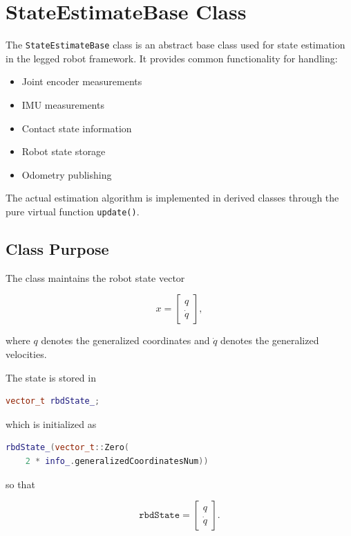 \section{StateEstimateBase Class}

The \texttt{StateEstimateBase} class is an abstract base class used for state estimation in the legged robot framework. It provides common functionality for handling:

\begin{itemize}
    \item Joint encoder measurements
    \item IMU measurements
    \item Contact state information
    \item Robot state storage
    \item Odometry publishing
\end{itemize}

The actual estimation algorithm is implemented in derived classes through the pure virtual function \texttt{update()}.

\subsection{Class Purpose}

The class maintains the robot state vector

\begin{equation}
x =
\begin{bmatrix}
q \\
\dot{q}
\end{bmatrix},
\end{equation}

where \(q\) denotes the generalized coordinates and \(\dot{q}\) denotes the generalized velocities.

The state is stored in

\begin{lstlisting}[language=C++]
vector_t rbdState_;
\end{lstlisting}

which is initialized as

\begin{lstlisting}[language=C++]
rbdState_(vector_t::Zero(
    2 * info_.generalizedCoordinatesNum))
\end{lstlisting}

so that

\begin{equation}
\texttt{rbdState} =
\begin{bmatrix}
q \\
\dot{q}
\end{bmatrix}.
\end{equation}

